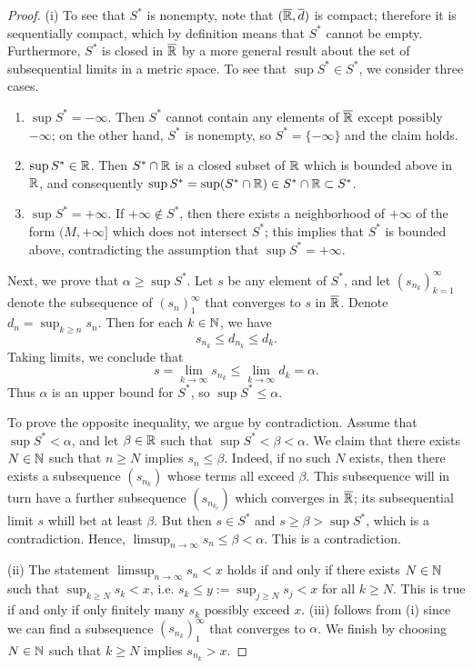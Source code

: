 \documentclass[12pt]{article} %
\begin{document}
\begin{proof}
    (i) To see that $S^*$ is nonempty, note that $(\overline{\mathbb{R}}, \overline{d})$ is compact; therefore it is sequentially compact, which by definition means that $S^*$ cannot be empty. Furthermore, $S^*$ is closed in $\overline{\mathbb{R}}$ by a more general result about the set of subsequential limits in a metric space. To see that $\sup S^* \in S^*$, we consider three cases.
    \begin{enumerate}
        \item $\sup S^* = -\infty$. Then $S^*$ cannot contain any elements of $\overline{\mathbb{R}}$ except possibly $-\infty$; on the other hand, $S^*$ is nonempty, so $S^* = \{-\infty\}$ and the claim holds.
        \item $\sup S^* \in \mathbb{R}$. Then $S^* \cap \mathbb{R}$ is a closed subset of $\mathbb{R}$ which is bounded above in $\mathbb{R}$, and consequently $\sup S^* = \sup(S^* \cap \mathbb{R}) \in S^* \cap \mathbb{R} \subset S^*$.
        \item $\sup S^* = +\infty$. If $+\infty \notin S^*$, then there exists a neighborhood of $+\infty$ of the form $(M, +\infty]$ which does not intersect $S^*$; this implies that $S^*$ is bounded above, contradicting the assumption that $\sup S^* = +\infty$.
    \end{enumerate}

    Next, we prove that $\alpha \geq \sup S^*$. Let $s$ be any element of $S^*$, and let $(s_{n_k})_{k=1}^{\infty}$ denote the subsequence of $(s_n)_1^\infty$ that converges to $s$ in $\overline{\mathbb{R}}$. Denote $d_n = \sup_{k \geq n} s_n$. Then for each $k \in \mathbb{N}$, we have \[s_{n_k} \leq d_{n_k} \leq d_k.\] Taking limits, we conclude that \[s = \lim_{k \to \infty} s_{n_k} \leq \lim_{k \to \infty} d_k = \alpha.\] Thus $\alpha$ is an upper bound for $S^*$, so $\sup S^* \leq \alpha$.

    To prove the opposite inequality, we argue by contradiction. Assume that $\sup S^* < \alpha$, and let $\beta \in \mathbb{R}$ such that $\sup S^* < \beta < \alpha$. We claim that there exists $N \in \mathbb{N}$ such that $n \geq N$ implies $s_n \leq \beta$. Indeed, if no such $N$ exists, then there exists a subsequence $(s_{n_k})$ whose terms all exceed $\beta$. This subsequence will in turn have a further subsequence $(s_{n_{k_\ell}})$ which converges in $\overline{\mathbb{R}}$; its subsequential limit $s$ whill bet at least $\beta$. But then $s \in S^*$ and $s \geq \beta > \sup S^*$, which is a contradiction. Hence, $\limsup_{n \to \infty} s_n \leq \beta < \alpha$. This is a contradiction.

    (ii) The statement $\limsup_{n \to \infty} s_n < x$ holds if and only if there exists $N \in \mathbb{N}$ such that $\sup_{k \geq N} s_k < x$, i.e. $s_k \leq y := \sup_{j \geq N} s_j < x$ for all $k \geq N$. This is true if and only if only finitely many $s_k$ possibly exceed $x$. (iii) follows from (i) since we can find a subsequence $(s_{n_k})_1^\infty$ that converges to $\alpha$. We finish by choosing $N \in \mathbb{N}$ such that $k \geq N$ implies $s_{n_k} > x$.
\end{proof}
\end{document}
